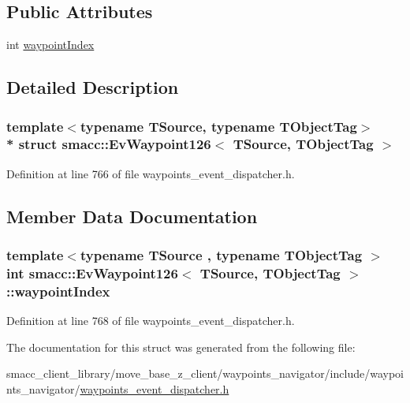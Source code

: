 \subsection*{Public Attributes}
\begin{DoxyCompactItemize}
\item 
int \hyperlink{structsmacc_1_1EvWaypoint126_a9af172f6fc6b045ecb52bbbee391b18a}{waypoint\+Index}
\end{DoxyCompactItemize}


\subsection{Detailed Description}
\subsubsection*{template$<$typename T\+Source, typename T\+Object\+Tag$>$\\*
struct smacc\+::\+Ev\+Waypoint126$<$ T\+Source, T\+Object\+Tag $>$}



Definition at line 766 of file waypoints\+\_\+event\+\_\+dispatcher.\+h.



\subsection{Member Data Documentation}
\subsubsection[{\texorpdfstring{waypoint\+Index}{waypointIndex}}]{\setlength{\rightskip}{0pt plus 5cm}template$<$typename T\+Source , typename T\+Object\+Tag $>$ int {\bf smacc\+::\+Ev\+Waypoint126}$<$ T\+Source, T\+Object\+Tag $>$\+::waypoint\+Index}\hypertarget{structsmacc_1_1EvWaypoint126_a9af172f6fc6b045ecb52bbbee391b18a}{}\label{structsmacc_1_1EvWaypoint126_a9af172f6fc6b045ecb52bbbee391b18a}


Definition at line 768 of file waypoints\+\_\+event\+\_\+dispatcher.\+h.



The documentation for this struct was generated from the following file\+:\begin{DoxyCompactItemize}
\item 
smacc\+\_\+client\+\_\+library/move\+\_\+base\+\_\+z\+\_\+client/waypoints\+\_\+navigator/include/waypoints\+\_\+navigator/\hyperlink{waypoints__event__dispatcher_8h}{waypoints\+\_\+event\+\_\+dispatcher.\+h}\end{DoxyCompactItemize}
